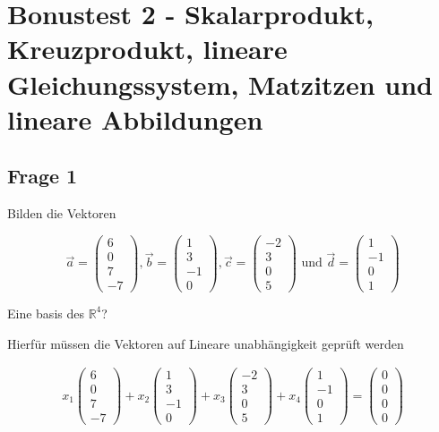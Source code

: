 \chapter{Bonustest 2 - Skalarprodukt, Kreuzprodukt, lineare Gleichungssystem, Matzitzen und lineare Abbildungen}

\section{Frage 1}

Bilden die Vektoren 

\[
\vec{a} = \begin{pmatrix}
    6 \\ 0 \\ 7 \\ -7
\end{pmatrix}, \vec{b} = \begin{pmatrix}
    1 \\3 \\ -1 \\ 0
\end{pmatrix}, \vec{c} = \begin{pmatrix}
    -2 \\ 3 \\ 0 \\ 5
\end{pmatrix} \text{ und } \vec{d} = \begin{pmatrix}
    1 \\ -1 \\ 0 \\ 1
\end{pmatrix}
\]

Eine basis des $\mathbb{R}^4$?

Hierfür müssen die Vektoren auf Lineare unabhängigkeit geprüft werden

\begin{align*}
    x_1 \begin{pmatrix}
        6 \\ 0 \\ 7 \\ -7
    \end{pmatrix} + x_2 \begin{pmatrix}
        1 \\3 \\ -1 \\ 0
    \end{pmatrix} + x_3 \begin{pmatrix}
        -2 \\ 3 \\ 0 \\ 5
    \end{pmatrix} + x_4 \begin{pmatrix}
        1 \\ -1 \\ 0 \\ 1
    \end{pmatrix} = \begin{pmatrix}
        0 \\ 0 \\ 0 \\ 0
    \end{pmatrix}
\end{align*}

